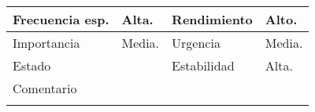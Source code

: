 \documentclass{article}
\begin{document}
\begin{table}[h]
\begin{tabular}{|l|l|l|l|l|l|}
\hline
\multicolumn{1}{|p{2cm}|}{Frecuencia esp.} & \multicolumn{2}{p{3cm}}{Alta.} & \multicolumn{1}{|p{2cm}|}{Rendimiento} & \multicolumn{2}{p{3cm}|}{Alto.}\\
\hline
\multicolumn{1}{|p{2cm}|}{Importancia} & \multicolumn{2}{p{3cm}}{Media.} & \multicolumn{1}{|p{2cm}|}{Urgencia} & \multicolumn{2}{p{3cm}|}{Media.}\\
\hline
\multicolumn{1}{|p{2cm}|}{Estado} & \multicolumn{2}{p{3cm}}{} & \multicolumn{1}{|p{2cm}|}{Estabilidad} & \multicolumn{2}{p{3cm}|}{Alta.}\\
\hline
\multicolumn{6}{|p{10cm}|}{Comentario}\\
\hline
\multicolumn{6}{|p{10cm}|}{}\\
\hline
\end{tabular}
\end{table}

\clearpage
\end{document}
